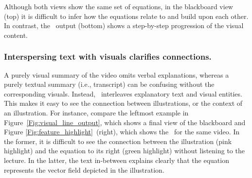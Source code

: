 Although both views show the same set of equations, in the blackboard view (top) it is difficult to infer how the equations relate to and build upon each other. In contrast, the \systemname\ output (bottom) shows a step-by-step progression of the visual content. 


\subsubsection{Interspersing text with visuals clarifies connections.} 
A purely visual summary of the video omits verbal explanations, whereas a purely textual summary (i.e., transcript) can be confusing without the corresponding visuals. Instead, \systemname\ interleaves explanatory text and visual entities. This makes it easy to see the connection between illustrations, or the context of an illustration. For instance, compare the leftmost example in Figure~\ref{Fig:visual_line_output}, which shows a final view of the blackboard and Figure \ref{Fig:feature_highlight}~(right), which shows the \systemname\ for the same video. In the former, it is difficult to see the connection between the illustration (pink highlight) and the equation to its right (green highlight) without listening to the lecture. In the latter, the text in-between explains clearly that the equation represents the vector field depicted in the illustration.

